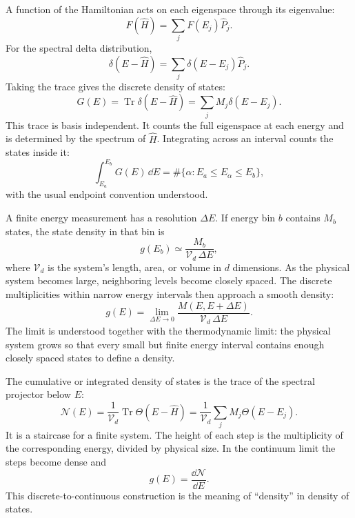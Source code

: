 A function of the Hamiltonian acts on each eigenspace through its eigenvalue:
\begin{equation}
  F(\hat H)=\sum_jF(E_j)\hat P_j.
  \label{eq:function-of-hamiltonian-spectral-representation}
\end{equation}
For the spectral delta distribution,
\begin{equation}
  \delta(E-\hat H)
  =\sum_j\delta(E-E_j)\hat P_j.
  \label{eq:spectral-delta-operator}
\end{equation}
Taking the trace gives the discrete density of states:
\begin{equation}
  \boxed{
  G(E)
  =\operatorname{Tr}\delta(E-\hat H)
  =\sum_jM_j\delta(E-E_j).
  }
  \label{eq:discrete-density-of-states-distribution}
\end{equation}
This trace is basis independent.  It counts the full eigenspace at each energy
and is determined by the spectrum of $\hat H$.
Integrating across an interval counts the states inside it:
\begin{equation}
  \int_{E_a}^{E_b}G(E)\,\dd E
  =\#\{\alpha:E_a\le E_\alpha\le E_b\},
  \label{eq:discrete-dos-interval-count}
\end{equation}
with the usual endpoint convention understood.

A finite energy measurement has a resolution $\Delta E$.  If energy bin $b$
contains $M_b$ states, the state density in that bin is
\begin{equation}
  g(E_b)
  \simeq\frac{M_b}{\mathcal V_d\,\Delta E},
  \label{eq:dos-from-discrete-bin-multiplicity}
\end{equation}
where $\mathcal V_d$ is the system's length, area, or volume in $d$ dimensions.
As the physical system becomes large, neighboring levels become closely spaced.
The discrete multiplicities within narrow energy intervals then approach a
smooth density:
\begin{equation}
  \boxed{
  g(E)
  =\lim_{\Delta E\to0}
   \frac{M(E,E+\Delta E)}{\mathcal V_d\,\Delta E}.
  }
  \label{eq:dos-continuum-limit-of-multiplicity}
\end{equation}
The limit is understood together with the thermodynamic limit: the physical
system grows so that every small but finite energy interval contains enough
closely spaced states to define a density.

The cumulative or integrated density of states is the trace of the spectral
projector below $E$:
\begin{equation}
  \mathcal N(E)
  =\frac{1}{\mathcal V_d}
   \operatorname{Tr}\Theta(E-\hat H)
  =\frac{1}{\mathcal V_d}
   \sum_jM_j\Theta(E-E_j).
  \label{eq:discrete-integrated-density-of-states}
\end{equation}
It is a staircase for a finite system.  The height of each step is the
multiplicity of the corresponding energy, divided by physical size.  In the
continuum limit the steps become dense and
\begin{equation}
  g(E)=\frac{\dd\mathcal N}{\dd E}.
  \label{eq:dos-derivative-of-integrated-count}
\end{equation}
This discrete-to-continuous construction is the meaning of ``density'' in
density of states.

